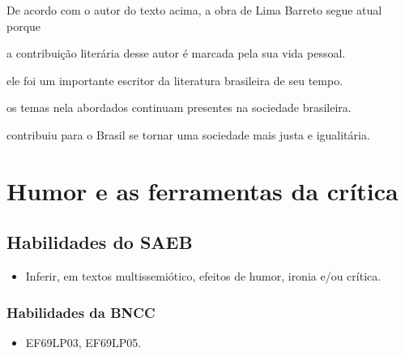 De acordo com o autor do texto acima, a obra de Lima Barreto segue atual 
porque 

\begin{escolha}

  \item a contribuição literária desse autor é marcada pela sua vida pessoal.

  \item ele foi um importante escritor da literatura brasileira de seu tempo.
  
  \item os temas nela abordados continuam presentes na sociedade brasileira.
  
  \item contribuiu para o Brasil se tornar uma sociedade mais justa e igualitária.

\end{escolha}


\chapter{Humor e as ferramentas da crítica}

\section*{Habilidades do SAEB}

\begin{itemize}

  \item Inferir, em textos multissemiótico, efeitos de humor, ironia e/ou
  crítica.

\end{itemize}

\subsection{Habilidades da BNCC}

\begin{itemize}

  \item EF69LP03, EF69LP05.

\end{itemize}

